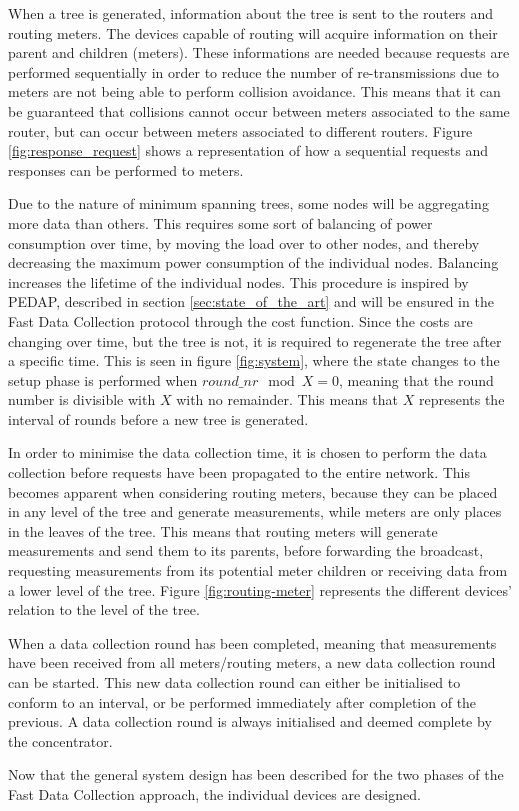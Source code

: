 
When a tree is generated, information about the tree is sent to the routers and routing meters. The devices capable of routing will acquire information on their parent and children (meters). These informations are needed because requests are performed sequentially in order to reduce the number of re-transmissions due to meters are not being able to perform collision avoidance. This means that it can be guaranteed that collisions cannot occur between meters associated to the same router, but can occur between meters associated to different routers. Figure \ref{fig:response_request} shows a representation of how a sequential requests and responses can be performed to meters.

Due to the nature of minimum spanning trees, some nodes will be aggregating more data than others. This requires some sort of balancing of power consumption over time, by moving the load over to other nodes, and thereby decreasing the maximum power consumption of the individual nodes. Balancing increases the lifetime of the individual nodes. This procedure is inspired by PEDAP, described in section \ref{sec:state_of_the_art} and will be ensured in the Fast Data Collection protocol through the cost function. Since the costs are changing over time, but the tree is not, it is required to regenerate the tree after a specific time. This is seen in figure \ref{fig:system}, where the state changes to the setup phase is performed when \mbox{$round\_nr \mod X = 0$}, meaning that the round number is divisible with $X$ with no remainder. This means that $X$ represents the interval of rounds before a new tree is generated.

In order to minimise the data collection time, it is chosen to perform the data collection before requests have been propagated to the entire network. This becomes apparent when considering routing meters, because they can be placed in any level of the tree and generate measurements, while meters are only places in the leaves of the tree. This means that routing meters will generate measurements and send them to its parents, before forwarding the broadcast, requesting measurements from its potential meter children or receiving data from a lower level of the tree. Figure \ref{fig:routing-meter} represents the different devices' relation to the level of the tree.


When a data collection round has been completed, meaning that measurements have been received from all meters/routing meters, a new data collection round can be started. This new data collection round can either be initialised to conform to an interval, or be performed immediately after completion of the previous. A data collection round is always initialised and deemed complete by the concentrator.

Now that the general system design has been described for the two phases of the Fast Data Collection approach, the individual devices are designed.
